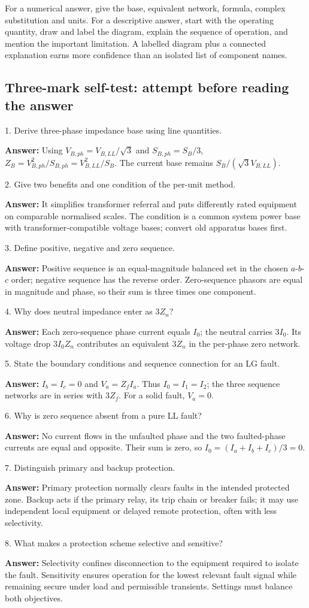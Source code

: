 \documentclass[11pt,a4paper]{article}
\newcommand{\checkq}[2]{\begin{tcolorbox}[breakable=false,colback=pale,colframe=teal,coltitle=white,title={Check your understanding}]#1\par\textbf{Answer:} #2\end{tcolorbox}}
\begin{document}
For a numerical answer, give the base, equivalent network, formula, complex substitution and units. For a descriptive answer, start with the operating quantity, draw and label the diagram, explain the sequence of operation, and mention the important limitation. A labelled diagram plus a connected explanation earns more confidence than an isolated list of component names.
\subsection{Three-mark self-test: attempt before reading the answer}
\checkq{1. Derive three-phase impedance base using line quantities.}{Using $V_{B,ph}=V_{B,LL}/\sqrt3$ and $S_{B,ph}=S_B/3$, $Z_B=V_{B,ph}^2/S_{B,ph}=V_{B,LL}^2/S_B$. The current base remains $S_B/(\sqrt3V_{B,LL})$.}
\checkq{2. Give two benefits and one condition of the per-unit method.}{It simplifies transformer referral and puts differently rated equipment on comparable normalised scales. The condition is a common system power base with transformer-compatible voltage bases; convert old apparatus bases first.}
\checkq{3. Define positive, negative and zero sequence.}{Positive sequence is an equal-magnitude balanced set in the chosen $a$-$b$-$c$ order; negative sequence has the reverse order. Zero-sequence phasors are equal in magnitude and phase, so their sum is three times one component.}
\checkq{4. Why does neutral impedance enter as $3Z_n$?}{Each zero-sequence phase current equals $I_0$; the neutral carries $3I_0$. Its voltage drop $3I_0Z_n$ contributes an equivalent $3Z_n$ in the per-phase zero network.}
\checkq{5. State the boundary conditions and sequence connection for an LG fault.}{$I_b=I_c=0$ and $V_a=Z_fI_a$. Thus $I_0=I_1=I_2$; the three sequence networks are in series with $3Z_f$. For a solid fault, $V_a=0$.}
\checkq{6. Why is zero sequence absent from a pure LL fault?}{No current flows in the unfaulted phase and the two faulted-phase currents are equal and opposite. Their sum is zero, so $I_0=(I_a+I_b+I_c)/3=0$.}
\checkq{7. Distinguish primary and backup protection.}{Primary protection normally clears faults in the intended protected zone. Backup acts if the primary relay, its trip chain or breaker fails; it may use independent local equipment or delayed remote protection, often with less selectivity.}
\checkq{8. What makes a protection scheme selective and sensitive?}{Selectivity confines disconnection to the equipment required to isolate the fault. Sensitivity ensures operation for the lowest relevant fault signal while remaining secure under load and permissible transients. Settings must balance both objectives.}
\end{document}
